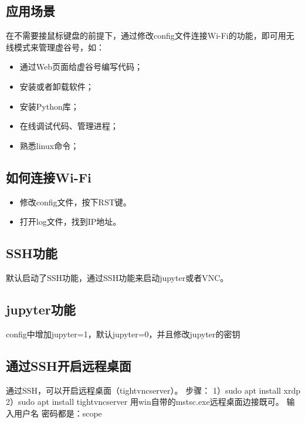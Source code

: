 \documentclass[letterpaper,10pt,english]{sphinxmanual}
\begin{document}
\subsection{应用场景}
\label{\detokenize{02.quick/2.2-wifi:id2}}
在不需要接鼠标键盘的前提下，通过修改config文件连接Wi-Fi的功能，即可用无线模式来管理虚谷号，如：
\begin{itemize}
\item {} 
通过Web页面给虚谷号编写代码；

\item {} 
安装或者卸载软件；

\item {} 
安装Python库；

\item {} 
在线调试代码、管理进程；

\item {} 
熟悉linux命令；

\end{itemize}


\subsection{如何连接Wi-Fi}
\label{\detokenize{02.quick/2.2-wifi:wi-fi}}\begin{itemize}
\item {} 
修改config文件，按下RST键。

\item {} 
打开log文件，找到IP地址。

\end{itemize}


\subsection{SSH功能}
\label{\detokenize{02.quick/2.2-wifi:ssh}}
默认启动了SSH功能，通过SSH功能来启动jupyter或者VNC。


\subsection{jupyter功能}
\label{\detokenize{02.quick/2.2-wifi:jupyter}}
config中增加jupyter=1，默认jupyter=0，并且修改jupyter的密钥


\subsection{通过SSH开启远程桌面}
\label{\detokenize{02.quick/2.2-wifi:id3}}
通过SSH，可以开启远程桌面（tightvncserver）。
步骤：
1）sudo apt install xrdp
2）sudo apt install tightvncserver
用win自带的mstsc.exe远程桌面边接既可。
输入用户名 密码都是：scope
\end{document}
